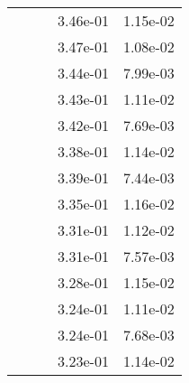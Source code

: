 \begin{table}
\begin{tabular}{c|cc|cc|}
\multicolumn{1}{|c|}{} & \multicolumn{1}{|c|}{} & \multicolumn{1}{|c|}{} & \multicolumn{1}{|c|}{  3.46e-01} & \multicolumn{1}{|c|}{  1.15e-02} \\ 
\multicolumn{1}{|c|}{} & \multicolumn{1}{|c|}{} & \multicolumn{1}{|c|}{} & \multicolumn{1}{|c|}{  3.47e-01} & \multicolumn{1}{|c|}{  1.08e-02} \\ 
\multicolumn{1}{|c|}{} & \multicolumn{1}{|c|}{} & \multicolumn{1}{|c|}{} & \multicolumn{1}{|c|}{  3.44e-01} & \multicolumn{1}{|c|}{  7.99e-03} \\ 
\multicolumn{1}{|c|}{} & \multicolumn{1}{|c|}{} & \multicolumn{1}{|c|}{} & \multicolumn{1}{|c|}{  3.43e-01} & \multicolumn{1}{|c|}{  1.11e-02} \\ 
\multicolumn{1}{|c|}{} & \multicolumn{1}{|c|}{} & \multicolumn{1}{|c|}{} & \multicolumn{1}{|c|}{  3.42e-01} & \multicolumn{1}{|c|}{  7.69e-03} \\ 
\multicolumn{1}{|c|}{} & \multicolumn{1}{|c|}{} & \multicolumn{1}{|c|}{} & \multicolumn{1}{|c|}{  3.38e-01} & \multicolumn{1}{|c|}{  1.14e-02} \\ 
\multicolumn{1}{|c|}{} & \multicolumn{1}{|c|}{} & \multicolumn{1}{|c|}{} & \multicolumn{1}{|c|}{  3.39e-01} & \multicolumn{1}{|c|}{  7.44e-03} \\ 
\multicolumn{1}{|c|}{} & \multicolumn{1}{|c|}{} & \multicolumn{1}{|c|}{} & \multicolumn{1}{|c|}{  3.35e-01} & \multicolumn{1}{|c|}{  1.16e-02} \\ 
\multicolumn{1}{|c|}{} & \multicolumn{1}{|c|}{} & \multicolumn{1}{|c|}{} & \multicolumn{1}{|c|}{  3.31e-01} & \multicolumn{1}{|c|}{  1.12e-02} \\ 
\multicolumn{1}{|c|}{} & \multicolumn{1}{|c|}{} & \multicolumn{1}{|c|}{} & \multicolumn{1}{|c|}{  3.31e-01} & \multicolumn{1}{|c|}{  7.57e-03} \\ 
\multicolumn{1}{|c|}{} & \multicolumn{1}{|c|}{} & \multicolumn{1}{|c|}{} & \multicolumn{1}{|c|}{  3.28e-01} & \multicolumn{1}{|c|}{  1.15e-02} \\ 
\multicolumn{1}{|c|}{} & \multicolumn{1}{|c|}{} & \multicolumn{1}{|c|}{} & \multicolumn{1}{|c|}{  3.24e-01} & \multicolumn{1}{|c|}{  1.11e-02} \\ 
\multicolumn{1}{|c|}{} & \multicolumn{1}{|c|}{} & \multicolumn{1}{|c|}{} & \multicolumn{1}{|c|}{  3.24e-01} & \multicolumn{1}{|c|}{  7.68e-03} \\ 
\multicolumn{1}{|c|}{} & \multicolumn{1}{|c|}{} & \multicolumn{1}{|c|}{} & \multicolumn{1}{|c|}{  3.23e-01} & \multicolumn{1}{|c|}{  1.14e-02} \\ 

\end{tabular}
\end{table}
